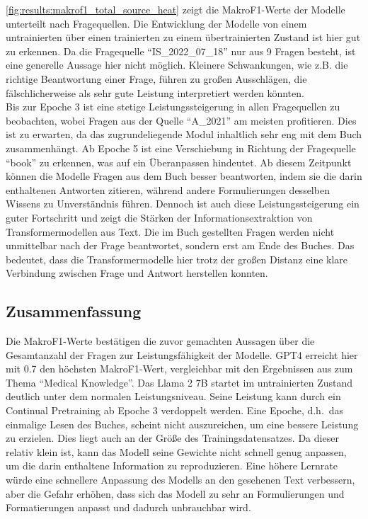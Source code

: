
\cref{fig:results:makrof1_total_source_heat} zeigt die MakroF1-Werte der Modelle unterteilt nach Fragequellen.
Die Entwicklung der Modelle von einem untrainierten über einen trainierten zu einem übertrainierten Zustand ist hier gut zu erkennen.
Da die Fragequelle \enquote{IS\_2022\_07\_18} nur aus \num{9} Fragen besteht, ist eine generelle Aussage hier nicht möglich.
Kleinere Schwankungen, wie z.B. die richtige Beantwortung einer Frage, führen zu großen Ausschlägen, die fälschlicherweise als sehr gute Leistung interpretiert werden könnten.\\

Bis zur Epoche 3 ist eine stetige Leistungssteigerung in allen Fragequellen zu beobachten, wobei Fragen aus der Quelle \enquote{A\_2021} am meisten profitieren.
Dies ist zu erwarten, da das zugrundeliegende Modul inhaltlich sehr eng mit dem Buch  zusammenhängt.
Ab Epoche 5 ist eine Verschiebung in Richtung der Fragequelle \enquote{book} zu erkennen, was auf ein Überanpassen hindeutet.
Ab diesem Zeitpunkt können die Modelle Fragen aus dem Buch besser beantworten, indem sie die darin enthaltenen Antworten zitieren, während andere Formulierungen desselben Wissens zu Unverständnis führen.
Dennoch ist auch diese Leistungssteigerung ein guter Fortschritt und zeigt die Stärken der Informationsextraktion von Transformermodellen aus Text.
Die im Buch gestellten Fragen werden nicht unmittelbar nach der Frage beantwortet, sondern erst am Ende des Buches.
Das bedeutet, dass die Transformermodelle hier trotz der großen Distanz eine klare Verbindung zwischen Frage und Antwort herstellen konnten.

\subsection{Zusammenfassung}
Die MakroF1-Werte bestätigen die zuvor gemachten Aussagen über die Gesamtanzahl der Fragen zur Leistungsfähigkeit der Modelle.
GPT4 erreicht hier mit \num{0.7} den höchsten MakroF1-Wert, vergleichbar mit den Ergebnissen aus \citet{gpt4} zum Thema \enquote{Medical Knowledge}.
Das Llama 2 7B startet im untrainierten Zustand deutlich unter dem normalen Leistungsniveau.
Seine Leistung kann durch ein Continual Pretraining ab Epoche 3 verdoppelt werden.
Eine Epoche, d.h.\ das einmalige Lesen des Buches, scheint nicht auszureichen, um eine bessere Leistung zu erzielen.
Dies liegt auch an der Größe des Trainingsdatensatzes.
Da dieser relativ klein ist, kann das Modell seine Gewichte nicht schnell genug anpassen, um die darin enthaltene Information zu reproduzieren.
Eine höhere Lernrate würde eine schnellere Anpassung des Modells an den gesehenen Text verbessern, aber die Gefahr erhöhen,
dass sich das Modell zu sehr an Formulierungen und Formatierungen anpasst und dadurch unbrauchbar wird.\\

